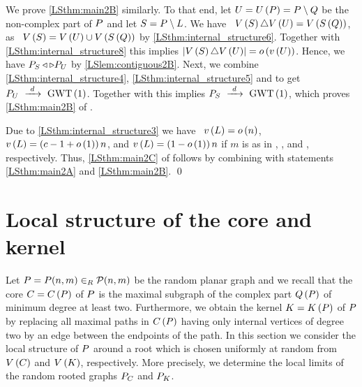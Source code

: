 We prove \ref{LSthm:main2B} similarly. To that end, let $U=U\left(P\right)=P\setminus Q$ be the non-complex part of $P$ and let $S=P\setminus L$. We have \whp\ $V\left(S\right)\triangle V\left(U\right)=V\left(S\left(Q\right)\right)$, as \whp\ $V\left(S\right)=V\left(U\right)\cup V\left(S\left(Q\right)\right)$ by \ref{LSthm:internal_structure6}. Together with \ref{LSthm:internal_structure8} this implies $\left|V\left(S\right)\triangle V\left(U\right)\right|=o\left(v\left({U}\right)\right)$. Hence, we have $P_S \triangleleft \triangleright P_U$ by \ref{LSlem:contiguous2B}. Next, we combine \ref{LSthm:internal_structure4}, \ref{LSthm:internal_structure5} and  to get $P_U~\xrightarrow{~d~}~\operatorname{GWT}\left(1\right)$. Together with  this implies $P_S~\xrightarrow{~d~}~\operatorname{GWT}\left(1\right)$, which proves \ref{LSthm:main2B} of .

Due to \ref{LSthm:internal_structure3} we have \whp\ $v\left({L}\right)=o\left(n\right)$, $v\left({L}\right)=\left(c-1+o\left(1\right)\right)n$, and $v\left({L}\right)=\left(1-o\left(1\right)\right)n$ if $m$ is as in , , and , respectively. Thus, \ref{LSthm:main2C} of  follows by combining  with statements \ref{LSthm:main2A} and \ref{LSthm:main2B}. \qed

\section{Local structure of the core and kernel}\label{LSsec:local_core_kernel}
Let $P=P(n,m)\in_R\mathcal{P}(n,m)$ be the random planar graph and we recall that the core $C=C\left(P\right)$ of $P$ is the maximal subgraph of the complex part $Q\left(P\right)$ of minimum degree at least two. Furthermore, we obtain the kernel $K=K\left(P\right)$ of $P$ by replacing all maximal paths in $C\left(P\right)$ having only internal vertices of degree two by an edge between the endpoints of the path. In this section we consider the local structure of $P$ around a root which is chosen uniformly at random from $V\left(C\right)$ and $V\left(K\right)$, respectively. More precisely, we determine the local limits of the random rooted graphs $P_C$ and $P_K$.

